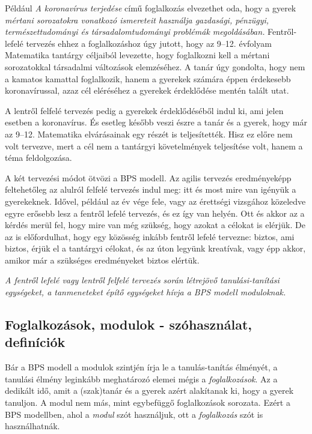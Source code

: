 Például \emph{A koronavírus terjedése} című foglalkozás elvezethet oda,
hogy a gyerek \emph{mértani sorozatokra vonatkozó ismereteit használja
gazdasági, pénzügyi, természettudományi és társadalomtudományi problémák
megoldásában.} Fentről-lefelé tervezés ehhez a foglalkozáshoz úgy
jutott, hogy az 9--12. évfolyam Matematika tantárgy céljaiból levezette,
hogy foglalkozni kell a mértani sorozatokkal társadalmi változások
elemzéséhez. A tanár úgy gondolta, hogy nem a kamatos kamattal
foglalkozik, hanem a gyerekek számára éppen érdekesebb koronavírussal,
azaz cél eléréséhez a gyerekek érdeklődése mentén talált utat.

A lentről felfelé tervezés pedig a gyerekek érdeklődéséből indul ki, ami
jelen esetben a koronavírus. És esetleg később veszi észre a tanár és a
gyerek, hogy már az 9--12. Matematika elvárásainak egy részét is
teljesítették. Hisz ez előre nem volt tervezve, mert a cél nem a
tantárgyi követelmények teljesítése volt, hanem a téma feldolgozása.

A két tervezési módot ötvözi a BPS modell. Az agilis tervezés
eredményeképp feltehetőleg az alulról felfelé tervezés indul meg: itt és
most mire van igényük a gyerekeknek. Idővel, például az év vége fele,
vagy az érettségi vizsgához közeledve egyre erősebb lesz a fentről
lefelé tervezés, és ez így van helyén. Ott és akkor az a kérdés merül
fel, hogy mire van még szükség, hogy azokat a célokat is elérjük. De az
is előfordulhat, hogy egy közösség inkább fentről lefelé tervezne:
biztos, ami biztos, érjük el a tantárgyi célokat, és az úton legyünk
kreatívak, vagy épp akkor, amikor már a szükséges eredményeket biztos
elértük.

\emph{A fentről lefelé vagy lentről felfelé tervezés során létrejövő
tanulási-ta\-ní\-tá\-si egységeket, a tanmeneteket építő egységeket hívja a
BPS modell moduloknak.}

\hypertarget{foglalkozasok-modulok---szohasznalat-definiciok}{%
\subsection{Foglalkozások, modulok - szóhasználat,
definíciók}\label{foglalkozasok-modulok---szohasznalat-definiciok}}

Bár a BPS modell a modulok szintjén írja le a tanulás-tanítás élményét,
a tanulási élmény leginkább meghatározó elemei mégis a
\emph{foglalkozások}. Az a dedikált idő, amit a (szak)tanár és a gyerek
azért alakítanak ki, hogy a gyerek tanuljon. A modul nem más, mint
egybefüggő foglalkozások sorozata. Ezért a BPS modellben, ahol a \emph{modul}
szót használjuk, ott a \emph{foglalkozás} szót is használhatnák.

